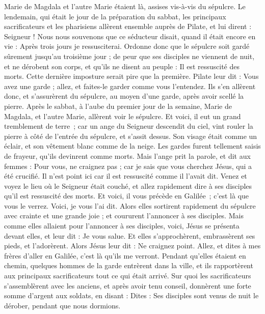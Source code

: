 \begin{multicols}{2}
{Marie de Magdala et l’autre Marie étaient là, assises vis-à-vis du sépulcre.
Le lendemain, qui était le jour de la préparation du sabbat, les principaux sacrificateurs et les pharisiens allèrent ensemble auprès de Pilate,
et lui dirent : Seigneur ! Nous nous souvenons que ce séducteur disait, quand il était encore en vie : Après trois jours je ressusciterai.
Ordonne donc que le sépulcre soit gardé sûrement jusqu’au troisième jour ; de peur que ses disciples ne viennent de nuit, et ne dérobent son corps, et qu'ils ne disent au peuple : Il est ressuscité des morts. Cette dernière imposture serait pire que la première.
Pilate leur dit : Vous avez une garde ; allez, et faites-le garder comme vous l’entendez.
Ils s'en allèrent donc, et s’assurèrent du sépulcre, au moyen d’une garde, après avoir scellé la pierre.
\VerseOne{}Après le sabbat, à l’aube du premier jour de la semaine, Marie de Magdala, et l'autre Marie, allèrent voir le sépulcre.
Et voici, il eut un grand tremblement de terre ; car un ange du Seigneur descendit du ciel, vint rouler la pierre à côté de l'entrée du sépulcre, et s'assit dessus.
Son visage était comme un éclair, et son vêtement blanc comme de la neige.
Les gardes furent tellement saisis de frayeur, qu'ils devinrent comme morts.
Mais l'ange prit la parole, et dit aux femmes : Pour vous, ne craignez pas ; car je sais que vous cherchez Jésus, qui a été crucifié.
Il n'est point ici car il est ressuscité comme il l'avait dit. Venez et voyez le lieu où le Seigneur était couché,
et allez rapidement dire à ses disciples qu'il est ressuscité des morts. Et voici, il vous précède en Galilée ; c’est là que vous le verrez. Voici, je vous l’ai dit.
Alors elles sortirent rapidement du sépulcre avec crainte et une grande joie ; et coururent l'annoncer à ses disciples.
Mais comme elles allaient pour l'annoncer à ses disciples, voici, Jésus se présenta devant elles, et leur dit : Je vous salue. Et elles s'approchèrent, embrassèrent ses pieds, et l'adorèrent.
Alors Jésus leur dit : Ne craignez point. Allez, et dites à mes frères d'aller en Galilée, c’est là qu'ils me verront.
Pendant qu’elles étaient en chemin, quelques hommes de la garde entrèrent dans la ville, et ils rapportèrent aux principaux sacrificateurs tout ce qui était arrivé.
Sur quoi les sacrificateurs s'assemblèrent avec les anciens, et après avoir tenu conseil, donnèrent une forte somme d'argent aux soldats,
en disant : Dites : Ses disciples sont venus de nuit le dérober, pendant que nous dormions.
}
\end{multicols}
